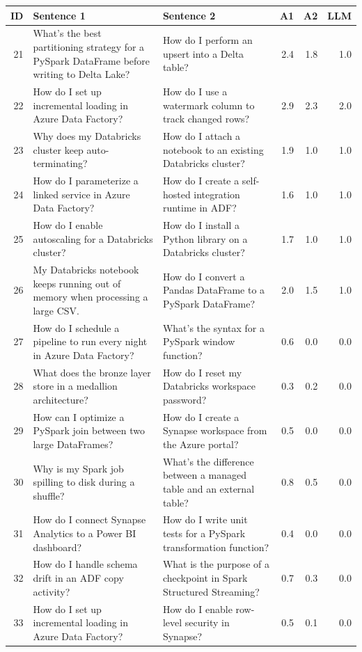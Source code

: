 \documentclass[11pt]{article}
\begin{document}
\begin{table}[t]
\centering\scriptsize\setlength{\tabcolsep}{3pt}
\begin{tabular}{rp{6.3cm}p{6.3cm}rrr}
\toprule
ID & Sentence 1 & Sentence 2 & A1 & A2 & LLM \\
\midrule
21 & What's the best partitioning strategy for a PySpark DataFrame before writing to Delta Lake? & How do I perform an upsert into a Delta table? & 2.4 & 1.8 & 1.0 \\
22 & How do I set up incremental loading in Azure Data Factory? & How do I use a watermark column to track changed rows? & 2.9 & 2.3 & 2.0 \\
23 & Why does my Databricks cluster keep auto-terminating? & How do I attach a notebook to an existing Databricks cluster? & 1.9 & 1.0 & 1.0 \\
24 & How do I parameterize a linked service in Azure Data Factory? & How do I create a self-hosted integration runtime in ADF? & 1.6 & 1.0 & 1.0 \\
25 & How do I enable autoscaling for a Databricks cluster? & How do I install a Python library on a Databricks cluster? & 1.7 & 1.0 & 1.0 \\
26 & My Databricks notebook keeps running out of memory when processing a large CSV. & How do I convert a Pandas DataFrame to a PySpark DataFrame? & 2.0 & 1.5 & 1.0 \\
27 & How do I schedule a pipeline to run every night in Azure Data Factory? & What's the syntax for a PySpark window function? & 0.6 & 0.0 & 0.0 \\
28 & What does the bronze layer store in a medallion architecture? & How do I reset my Databricks workspace password? & 0.3 & 0.2 & 0.0 \\
29 & How can I optimize a PySpark join between two large DataFrames? & How do I create a Synapse workspace from the Azure portal? & 0.5 & 0.0 & 0.0 \\
30 & Why is my Spark job spilling to disk during a shuffle? & What's the difference between a managed table and an external table? & 0.8 & 0.5 & 0.0 \\
31 & How do I connect Synapse Analytics to a Power BI dashboard? & How do I write unit tests for a PySpark transformation function? & 0.4 & 0.0 & 0.0 \\
32 & How do I handle schema drift in an ADF copy activity? & What is the purpose of a checkpoint in Spark Structured Streaming? & 0.7 & 0.3 & 0.0 \\
33 & How do I set up incremental loading in Azure Data Factory? & How do I enable row-level security in Synapse? & 0.5 & 0.1 & 0.0 \\

\end{tabular}
\end{table}
\end{document}
